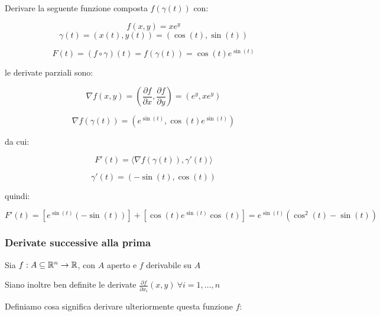 Derivare la seguente funzione composta \( f(\gamma(t))\) con:

\[
    f(x,y)= xe^{y}
\]
\[
    \gamma(t) = (x(t), y(t)) = (\cos (t) , \sin (t))
\]

\[
    F(t) = (f \circ \gamma) (t) = f(\gamma(t)) = \cos (t) e ^{\sin (t)}
\]

le derivate parziali sono:

\[
    \nabla f(x,y) = \left( \frac{\partial f}{\partial x}, \frac{\partial f}{\partial y} \right) = (e^{y}, xe^{y})
\]

\[
    \nabla f(\gamma(t)) = (e ^{\sin (t)}, \cos (t) e ^{\sin (t)})
\]

da cui:

\[
    F'(t) = \langle \nabla f(\gamma(t)), \gamma'(t) \rangle
\]

\[
    \gamma'(t) = (-\sin (t), \cos (t))
\]

quindi:

\[
    F'(t) = \left[ e ^{\sin(t)} (- \sin (t)) \right] + \left[ \cos (t) e ^{\sin (t)}\cos (t) \right] = e^{\sin(t)} \left( \cos^{2}(t) -\sin(t) \right)
\]

\pagebreak
\subsubsection{Derivate successive alla prima}

Sia \(f: A \subseteq \mathbb{R}^{n}  \rightarrow \mathbb{R} \), con \(A\) aperto e \(f\) derivabile su \(A\)

Siano inoltre ben definite le derivate \(\frac{\partial f}{\partial x_i}(x,y) ~\forall i=1,\ldots,n\)

Definiamo cosa significa derivare ulteriormente questa funzione \(f\):


